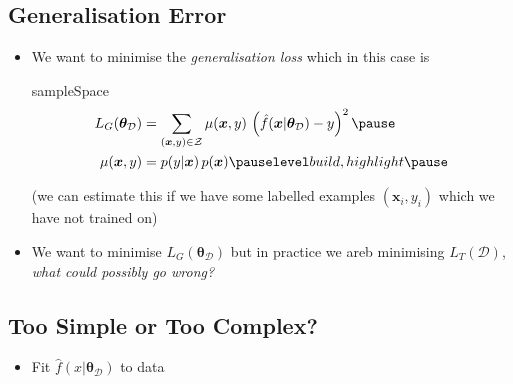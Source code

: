 
\begin{slide}
\section{Generalisation Error}

\begin{PauseHighLight}
  \begin{itemize}
  \item We want to minimise the \textit{generalisation loss} which in
    this case is
    
    \begin{rightImage}{sampleSpace}
      \begin{align*}
        L_G(\bm{\theta}_{\mathcal{D}}) &= \sum_{(\bm{x},y)\in\mathcal{Z}} \mu(\bm{x},y)\,
        \left(\hat{f}(\bm{x}\vert \bm{\theta}_\mathcal{D}) - y
        \right)^2\pause \\
        \mu(\bm{x}, y) &= p(y|\bm{x})\,p(\bm{x})\pauseb
      \end{align*}
    \end{rightImage}\pause

    (we can estimate this if we have some labelled examples
    $(\bm{x}_i,y_i)$ which we have not trained on)\pauseb
  \item We want to minimise $L_G(\bm{\theta}_{\mathcal{D}})$ but in practice we areb
    minimising $L_T(\mathcal{D})$\pause, \textit{what could possibly go wrong?}\pauseb
  \end{itemize}
\end{PauseHighLight}

\end{slide}


\begin{slide}
\section[-2]{Too Simple or Too Complex?}

\pb
\hypertarget{regression}{}

\begin{itemize}
\item Fit $\hat{f}(x|\bm{\theta}_\mathcal{D})$ to data\pauseh
  \begin{center}
    \pause
  \end{center}
\end{itemize}

\end{slide}


